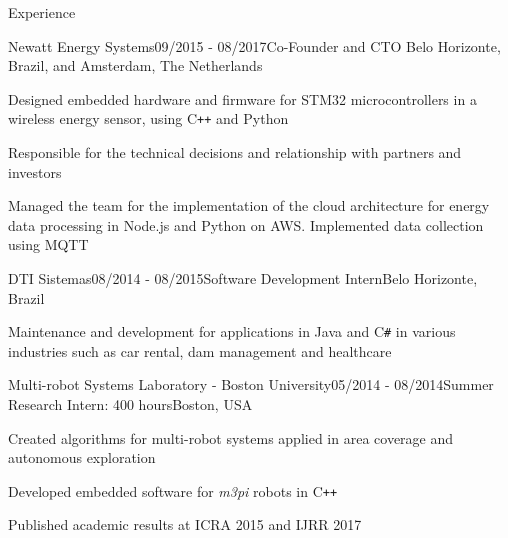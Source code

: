 \documentclass[12pt, a4paper]{resume} %
\begin{document}
\begin{rSection}{Experience}

	\begin{rSubsection}{Newatt Energy Systems}{09/2015 - 08/2017}{\normalfont Co-Founder and CTO}{ \normalfont Belo Horizonte, Brazil, and Amsterdam, The Netherlands}
		\item Designed embedded hardware and firmware for STM32 microcontrollers in a wireless energy sensor, using C\texttt{++} and Python
		\item Responsible for the technical decisions and relationship with partners and investors
		\item Managed the team for the implementation of the cloud architecture for energy data processing in Node.js and Python on AWS. Implemented data collection using MQTT
	\end{rSubsection}


	\begin{rSubsection}{DTI Sistemas}{08/2014 - 08/2015}{\normalfont Software Development Intern}{\normalfont Belo Horizonte, Brazil}
		\item Maintenance and development for applications in Java and C\texttt{\#} in various industries such as car rental, dam management and healthcare
	\end{rSubsection}

	\begin{rSubsection}{Multi-robot Systems Laboratory - Boston University}{05/2014 - 08/2014}{\normalfont Summer Research Intern: 400 hours}{\normalfont Boston,  USA}
		\item Created algorithms for multi-robot systems applied in area coverage and autonomous exploration
		\item Developed embedded software for \textit{m3pi} robots in C\texttt{++}
		\item Published academic results at ICRA 2015 and IJRR 2017
	\end{rSubsection}


\end{rSection}
\end{document}
